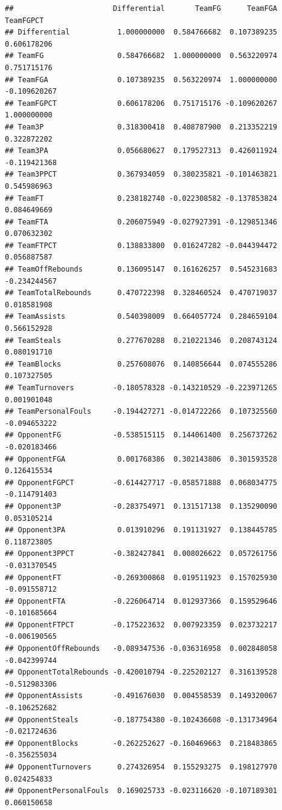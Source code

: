 \documentclass[]{book}
\begin{document}
\begin{verbatim}
##                       Differential       TeamFG      TeamFGA    TeamFGPCT
## Differential           1.000000000  0.584766682  0.107389235  0.606178206
## TeamFG                 0.584766682  1.000000000  0.563220974  0.751715176
## TeamFGA                0.107389235  0.563220974  1.000000000 -0.109620267
## TeamFGPCT              0.606178206  0.751715176 -0.109620267  1.000000000
## Team3P                 0.318300418  0.408787900  0.213352219  0.322872202
## Team3PA                0.056680627  0.179527313  0.426011924 -0.119421368
## Team3PPCT              0.367934059  0.380235821 -0.101463821  0.545986963
## TeamFT                 0.238182740 -0.022308582 -0.137853824  0.084649669
## TeamFTA                0.206075949 -0.027927391 -0.129851346  0.070632302
## TeamFTPCT              0.138833800  0.016247282 -0.044394472  0.056887587
## TeamOffRebounds        0.136095147  0.161626257  0.545231683 -0.234244567
## TeamTotalRebounds      0.470722398  0.328460524  0.470719037  0.018581908
## TeamAssists            0.540398009  0.664057724  0.284659104  0.566152928
## TeamSteals             0.277670288  0.210221346  0.208743124  0.080191710
## TeamBlocks             0.257608076  0.140856644  0.074555286  0.107327505
## TeamTurnovers         -0.180578328 -0.143210529 -0.223971265  0.001901048
## TeamPersonalFouls     -0.194427271 -0.014722266  0.107325560 -0.094653222
## OpponentFG            -0.538515115  0.144061400  0.256737262 -0.020183466
## OpponentFGA            0.001768386  0.302143806  0.301593528  0.126415534
## OpponentFGPCT         -0.614427717 -0.058571888  0.068034775 -0.114791403
## Opponent3P            -0.283754971  0.131517138  0.135290090  0.053105214
## Opponent3PA            0.013910296  0.191131927  0.138445785  0.118723805
## Opponent3PPCT         -0.382427841  0.008026622  0.057261756 -0.031370545
## OpponentFT            -0.269300868  0.019511923  0.157025930 -0.091558712
## OpponentFTA           -0.226064714  0.012937366  0.159529646 -0.101685664
## OpponentFTPCT         -0.175223632  0.007923359  0.023732217 -0.006190565
## OpponentOffRebounds   -0.089347536 -0.036316958  0.002848058 -0.042399744
## OpponentTotalRebounds -0.420010794 -0.225202127  0.316139528 -0.512983306
## OpponentAssists       -0.491676030  0.004558539  0.149320067 -0.106252682
## OpponentSteals        -0.187754380 -0.102436608 -0.131734964 -0.021724636
## OpponentBlocks        -0.262252627 -0.160469663  0.218483865 -0.356255034
## OpponentTurnovers      0.274326954  0.155293275  0.198127970  0.024254833
## OpponentPersonalFouls  0.169025733 -0.023116620 -0.107189301  0.060150658

\end{verbatim}
\end{document}
